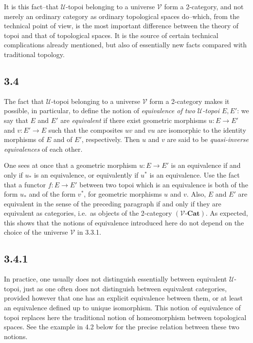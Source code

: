 \documentclass[11pt]{article}
\newcommand{\U}{\mathcal{U}}
\newcommand{\V}{\mathcal{V}}
\newcommand{\Cat}{\mathbf{Cat}}
\newcommand{\ie}{i.e.}
\providecommand{\Cat}{\operatorname{Cat}}
\begin{document}
It is this fact--that \(\U\)-topoi belonging to a universe \(\V\) form a 2-category, and not merely an ordinary category as ordinary topological spaces do--which, from the technical point of view, is the most important difference between the theory of topoi and that of topological spaces. It is the source of certain technical complications already mentioned, but also of essentially new facts compared with traditional topology.

\subsection*{3.4}
The fact that \(\U\)-topoi belonging to a universe \(\V\) form a 2-category makes it possible, in particular, to define the notion of \emph{equivalence of two \(\U\)-topoi \(E,E'\)}: we say that \(E\) and \(E'\) are \emph{equivalent} if there exist geometric morphisms \(u:E\to E'\) and \(v:E'\to E\) such that the composites \(uv\) and \(vu\) are isomorphic to the identity morphisms of \(E\) and of \(E'\), respectively. Then \(u\) and \(v\) are said to be \emph{quasi-inverse equivalences} of each other.

One sees at once that a geometric morphism \(u:E\to E'\) is an equivalence if and only if \(u_\ast\) is an equivalence, or equivalently if \(u^\ast\) is an equivalence. Use the fact that a functor \(f:E\to E'\) between two topoi which is an equivalence is both of the form \(u_\ast\) and of the form \(v^\ast\), for geometric morphisms \(u\) and \(v\). Also, \(E\) and \(E'\) are equivalent in the sense of the preceding paragraph if and only if they are equivalent as categories, \ie\ as objects of the 2-category \((\V\text{-}\Cat)\). As expected, this shows that the notions of equivalence introduced here do not depend on the choice of the universe \(\V\) in 3.3.1.

\subsection*{3.4.1}
In practice, one usually does not distinguish essentially between equivalent \(\U\)-topoi, just as one often does not distinguish between equivalent categories, provided however that one has an explicit equivalence between them, or at least an equivalence defined up to unique isomorphism. This notion of equivalence of topoi replaces here the traditional notion of homeomorphism between topological spaces. See the example in 4.2 below for the precise relation between these two notions.
\end{document}
